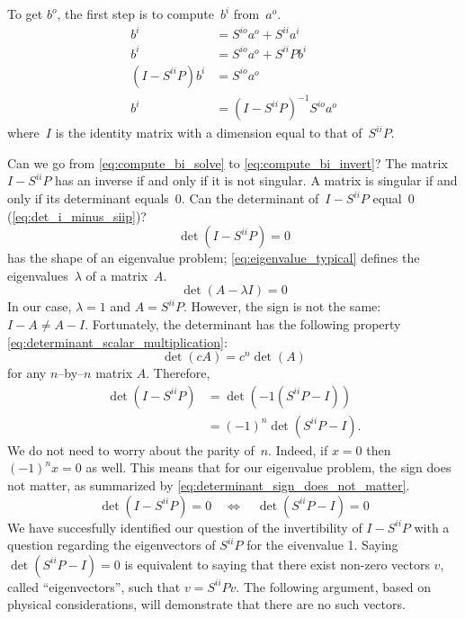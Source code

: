 To get $b^o$, the first step is to compute~$b^i$ from~$a^o$.
\begin{subequations}
    \begin{align}
        b^i &= S^{io}a^o + S^{ii}a^i \label{eq:compute_bi_ai} \\
        b^i &= S^{io}a^o + S^{ii}Pb^i \label{eq:compute_bi_bi} \\
        (I - S^{ii}P)b^i &= S^{io}a^o \label{eq:compute_bi_solve} \\
        b^i &= (I - S^{ii}P)^{-1} S^{io}a^o \label{eq:compute_bi_invert}
    \end{align} \label{eq:compute_bi}
\end{subequations}
where~$I$ is the identity matrix with a dimension equal to that of~$S^{ii}P$.

Can we go from \cref{eq:compute_bi_solve} to \cref{eq:compute_bi_invert}?
The matrix~$I - S^{ii}P$ has an inverse if and only if it is not singular.
A matrix is singular if and only if its determinant equals~0.
Can the determinant of~$I - S^{ii}P$ equal~0 (\cref{eq:det_i_minus_siip})?
\begin{equation}
    \det(I - S^{ii}P) = 0 \label{eq:det_i_minus_siip}
\end{equation}
 has the shape of an eigenvalue problem;
\cref{eq:eigenvalue_typical} defines the eigenvalues~$\lambda$ of a matrix~$A$.
\begin{equation}
    \det(A - \lambda I) = 0 \label{eq:eigenvalue_typical}
\end{equation}
In our case, $\lambda=1$ and $A=S^{ii}P$.
However, the sign is not the same: $I-A \neq A-I$.
Fortunately, the determinant has the following property \cref{eq:determinant_scalar_multiplication}:
\begin{equation}
    \det(c A) = c^n \det(A) \label{eq:determinant_scalar_multiplication}
\end{equation}
for any $n$--by--$n$ matrix $A$.
Therefore,
\begin{subequations}
    \begin{align}
        \det(I - S^{ii}P)
        &= \det(-1(S^{ii}P - I)) \\
        &= (-1)^n \det(S^{ii}P - I) \text{.}
    \end{align}
\end{subequations}
We do not need to worry about the parity of~$n$.
Indeed, if $x=0$ then $(-1)^n x = 0$ as well.
This means that for our eigenvalue problem, the sign does not matter, as summarized by \cref{eq:determinant_sign_does_not_matter}.
\begin{equation}
    \det(I - S^{ii}P) = 0
    \quad
    \Longleftrightarrow
    \quad
    \det(S^{ii}P - I) = 0
    \label{eq:determinant_sign_does_not_matter}
\end{equation}
We have succesfully identified our question of the invertibility of $I - S^{ii}P$ with a question regarding the eigenvectors of $S^{ii}P$ for the eivenvalue 1.
Saying $\det(S^{ii}P - I) = 0$ is equivalent to saying that there exist non-zero vectors $v$, called ``eigenvectors'', such that $v = S^{ii}Pv$.
The following argument, based on physical considerations, will demonstrate that there are no such vectors.

